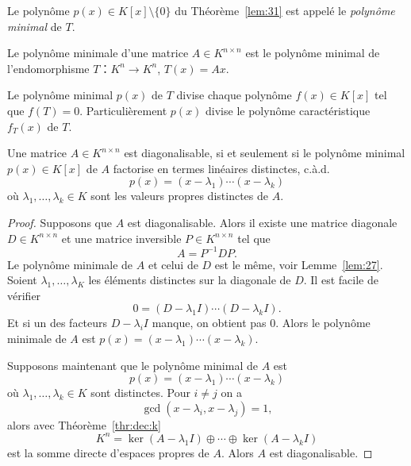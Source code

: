 \begin{definition}
  \label{def:64}
  Le polynôme $p(x) ∈ K[x]\setminus \{0\}$ du Théorème~\ref{lem:31} est appelé le \emph{polynôme minimal} de $T$.

  Le polynôme minimale d'une matrice $A ∈ K^{n ×n}$ est le polynôme minimal de l'endomorphisme $T： K^n → K^n$, $T(x) = Ax$. 
\end{definition}


\begin{remark}
  \label{rem:10} 
  Le polynôme minimal $p(x)$ de $T$ divise chaque polynôme $f(x) ∈ K[x]$ tel que $f(T) = 0$. Particulièrement $p(x)$ divise le polynôme caractéristique $f_T(x)$ de $T$.  
\end{remark}

\begin{theorem}
  \label{thr:60}
  Une matrice $A∈ K^{n ×n}$  est diagonalisable, si et seulement si le polynôme minimal $p(x) ∈ K[x]$ de $A$ factorise en termes linéaires distinctes, c.à.d.
  \begin{displaymath}
    p(x) = (x - λ_1) \cdots (x - λ_k) 
  \end{displaymath}
  où $λ_1,\dots,λ_k ∈ K$ sont les valeurs propres distinctes de $A$. 
\end{theorem}
\begin{proof}
  Supposons que $A$ est diagonalisable. Alors il existe une matrice diagonale $D ∈ K^{n ×n}$ et une matrice inversible $P ∈ K^{n ×n}$ tel que
  \begin{displaymath}
    A = P^{-1} D P. 
  \end{displaymath}
  Le polynôme minimale de $A$ et celui de $D$ est le même, voir Lemme~\ref{lem:27}.  Soient $λ_1,\dots,λ_K$ les éléments distinctes sur la diagonale de $D$. Il est facile de vérifier
  \begin{displaymath}
     0 = (D - λ_1I) \cdots (D - λ_kI). 
   \end{displaymath}
   Et si un des facteurs $D - λ_iI$ manque, on obtient pas $0$. Alors le polynôme minimale de $A$ est $p(x) = (x - λ_1) \cdots (x - λ_k)$.

   Supposons maintenant que le polynôme minimal de $A$ est
   \begin{displaymath}
    p(x) = (x - λ_1) \cdots (x - λ_k) 
  \end{displaymath}
  où $λ_1,\dots,λ_k ∈ K$ sont distinctes. Pour $i≠j$ on a
  \begin{displaymath}
    \gcd( x- λ_i, x - λ_j) = 1, 
  \end{displaymath}
  alors avec Théorème~\ref{thr:dec:k} 
  \begin{displaymath}
    K^n = \ker (A - λ_1 I) ⊕ \cdots ⊕ \ker (A - λ_k I)
  \end{displaymath}
  est la somme directe d'espaces propres de $A$. Alors $A$ est diagonalisable. 
  
\end{proof}

